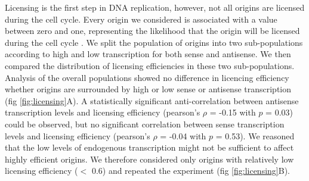 Licensing is the first step in DNA replication, however, not all origins are licensed during the cell cycle.
Every origin we considered is associated with a value between zero and one, representing the likelihood that the origin will be licensed during the cell cycle \cite{hawkins:2013:highresolution}. 
We split the population of origins into two sub-populations according to high and low transcription for both sense and antisense. 
We then compared the distribution of licensing efficiencies in these two sub-populations. 
Analysis of the overall populations showed no difference in licencing efficiency whether origins are surrounded by high or low sense or antisense transcription (fig \ref{fig:licensing}A). 
A statistically significant anti-correlation between antisense transcription levels and licensing efficiency (pearson’s $\rho$ = -0.15 with $p$ = 0.03) could be observed, but no significant correlation between sense transcription levels and licensing efficiency (pearson’s $\rho$ = -0.04 with $p$ = 0.53). 
We reasoned that the low levels of endogenous transcription might not be sufficient to affect highly efficient origins. We therefore considered only origins with relatively low licensing efficiency ($<$ 0.6) and repeated the experiment (fig \ref{fig:licensing}B).
